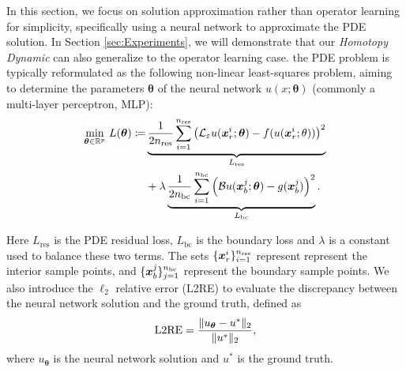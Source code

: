 In this section, we focus on solution approximation rather than operator learning for simplicity, specifically using a neural network to approximate the PDE solution. In Section \ref{sec:Experiments}, we will demonstrate that our \textit{Homotopy Dynamic} can also generalize to the operator learning case.  the PDE problem is typically reformulated as the following non-linear least-squares problem, aiming to determine the parameters $\boldsymbol{\theta}$ of the neural network $u(x;{\boldsymbol{\theta}})$ (commonly a multi-layer perceptron, MLP):
\begin{align}
    \underset{\boldsymbol{\theta} \in \mathbb{R}^p}{\mbox{min}}~L(\boldsymbol{\theta}) \coloneqq  & \underbrace{\frac{1}{2n_\textup{res}}\sum_{i=1}^{n_\textup{res}}\left(\mathcal L_\varepsilon u(\boldsymbol{x}_r^i; \boldsymbol{\theta})-f(u(\boldsymbol{x}_r^i;\theta))\right)^2}_{L_{\text{res}}}\nonumber \\ &+\lambda\underbrace{\frac{1}{2n_{\textup{bc}}}\sum^{n_{\textup{bc}}}_{i=1}\left(\mathcal B u(\boldsymbol{x}_b^j;\boldsymbol{\theta})-g(\boldsymbol{x}_b^j)\right)^2}_{ L_{\text{bc}}}. \label{loss}
\end{align}

Here $L_{\text{res}}$ is the PDE residual loss, $ L_{\text{bc}}$ is the boundary loss and $\lambda$ is a constant used to balance these two terms. The sets $\{\boldsymbol{x}_r^i\}^{n_\textup{res}}_{i=1}$ represent  represent the interior sample points, and $\{\boldsymbol{x}^j_b\}^{n_{\textup{bc}}}_{j=1}$ represent  the boundary sample points. %
We also introduce the \(\ell_2\) relative error (L2RE) to evaluate the discrepancy between the neural network solution and the ground truth, defined as
\begin{align*}
    \mathrm{L2RE} = \frac{\|u_{\boldsymbol{\theta}} - u^{*}\|_2}{\|u^{*}\|_2},
\end{align*}where \(u_{\boldsymbol{\theta}}\) is the neural network solution and \(u^{*}\) is the ground truth.


